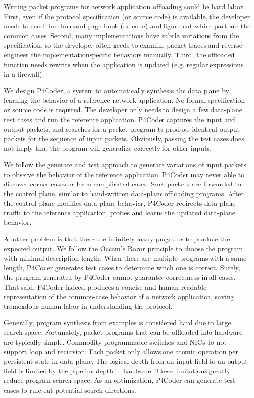 Writing packet programs for network application offloading could be hard labor. First, even if the protocol specification (or source code) is available, the developer needs to read the thousand-page book (or code) and figure out which part are the common cases. Second, many implementations have subtle variations from the specification, so the developer often needs to examine packet traces and reverse-engineer the implementationspecific behaviors manually. Third, the offloaded function needs rewrite when the application is updated (e.g. regular expressions in a firewall).

We design P4Coder, a system to automatically synthesis the data plane by learning the behavior of a reference network application. No formal specification or source code is required. The developer only needs to design a few data-plane test cases and run the reference application. P4Coder captures the input and output packets, and searches for a packet program to produce identical output packets for the sequence of input packets.  Obviously, passing the test cases does not imply that the program will generalize correctly for other inputs.

We follow the generate and test approach to generate variations of input packets to observe the behavior of the reference application. P4Coder may never able to discover corner cases or learn complicated cases. Such packets are forwarded to the control plane, similar to hand-written data-plane offloading programs.  After the control plane modifies data-plane behavior, P4Coder redirects data-plane traffic to the reference application, probes and learns the updated data-plane behavior.

Another problem is that there are infinitely many programs to produce the expected output. We follow the Occam’s Razor principle to choose the program with minimal description length. When there are multiple programs with a same length, P4Coder generates test cases to determine which one is correct. Surely, the program generated by P4Coder cannot guarantee correctness in all cases. That said, P4Coder indeed produces a concise and human-readable representation of the common-case behavior of a network application, saving tremendous human labor in understanding the protocol.

Generally, program synthesis from examples is considered hard due to large search space. Fortunately, packet programs that can be offloaded into hardware are typically simple. Commodity programmable switches and NICs do not support loop and recursion. Each packet only allows one atomic operation per persistent state in data plane. The logical depth from an input field to an output field is limited by the pipeline depth in hardware. These limitations greatly reduce program search space. As an optimization, P4Coder can generate test cases to rule out potential search directions.

